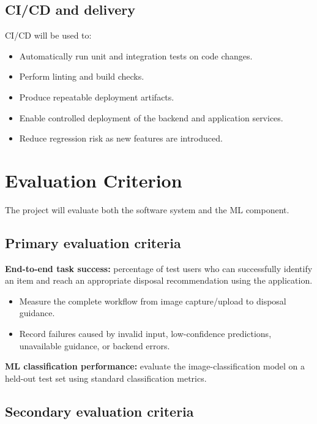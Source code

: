 \documentclass[11pt,a4paper]{article}
\begin{document}
\subsection{CI/CD and delivery}

CI/CD will be used to:

\begin{itemize}[leftmargin=0.7cm]
    \item Automatically run unit and integration tests on code changes.
    \item Perform linting and build checks.
    \item Produce repeatable deployment artifacts.
    \item Enable controlled deployment of the backend and application services.
    \item Reduce regression risk as new features are introduced.
\end{itemize}

\section{Evaluation Criterion}

The project will evaluate both the software system and the ML component.

\subsection{Primary evaluation criteria}

\textbf{End-to-end task success:} percentage of test users who can successfully identify an item and reach an appropriate disposal recommendation using the application.

\begin{itemize}[leftmargin=0.7cm]
    \item Measure the complete workflow from image capture/upload to disposal guidance.
    \item Record failures caused by invalid input, low-confidence predictions, unavailable guidance, or backend errors.
\end{itemize}

\textbf{ML classification performance:} evaluate the image-classification model on a held-out test set using standard classification metrics.

\subsection{Secondary evaluation criteria}
\end{document}
